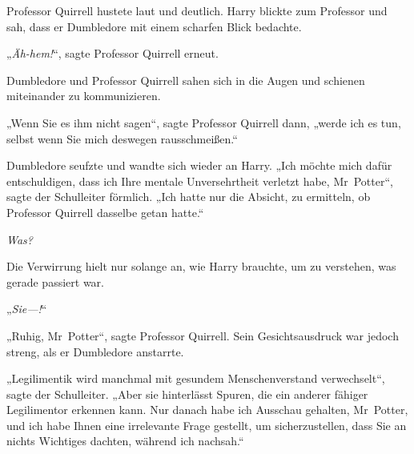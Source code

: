 Professor Quirrell hustete laut und deutlich. Harry blickte zum Professor und sah, dass er Dumbledore mit einem scharfen Blick bedachte.

„\emph{Äh-hem!}“, sagte Professor Quirrell erneut.

Dumbledore und Professor Quirrell sahen sich in die Augen und schienen miteinander zu kommunizieren.

„Wenn Sie es ihm nicht sagen“, sagte Professor Quirrell dann, „werde ich es tun, selbst wenn Sie mich deswegen rausschmeißen.“

Dumbledore seufzte und wandte sich wieder an Harry. „Ich möchte mich dafür entschuldigen, dass ich Ihre mentale Unversehrtheit verletzt habe, Mr~Potter“, sagte der Schulleiter förmlich. „Ich hatte nur die Absicht, zu ermitteln, ob Professor Quirrell dasselbe getan hatte.“

\emph{Was?}

Die Verwirrung hielt nur solange an, wie Harry brauchte, um zu verstehen, was gerade passiert war.

„\emph{Sie—!}“

„Ruhig, Mr~Potter“, sagte Professor Quirrell. Sein Gesichtsausdruck war jedoch streng, als er Dumbledore anstarrte.

„Legilimentik wird manchmal mit gesundem Menschenverstand verwechselt“, sagte der Schulleiter. „Aber sie hinterlässt Spuren, die ein anderer fähiger Legilimentor erkennen kann. Nur danach habe ich Ausschau gehalten, Mr~Potter, und ich habe Ihnen eine irrelevante Frage gestellt, um sicherzustellen, dass Sie an nichts Wichtiges dachten, während ich nachsah.“

